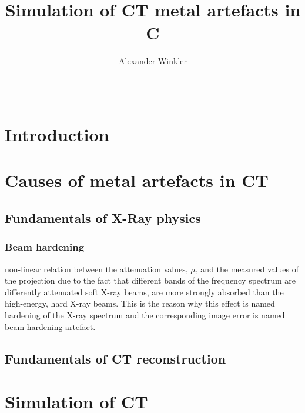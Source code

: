 \documentclass{acm_proc_article-sp}
\begin{document}
\setlength{\parindent}{10pt}
\setlength{\parskip}{35pt}



\title{Simulation of CT metal artefacts in C}
\author{
  \alignauthor Alexander Winkler\\
    \\
    \\
     }

\maketitle

\begin{abstract}
\end{abstract}


\section{Introduction}

\section{Causes of metal artefacts in CT}
\subsection{Fundamentals of X-Ray physics}
\subsubsection{Beam hardening}
non-linear relation between the attenuation values, \(\mu\), and the measured values of the projection
due to the fact that different bands of the frequency spectrum are differently attenuated
soft X-ray beams, are more strongly absorbed than the high-energy, hard X-ray beams. This is the reason why this effect is named hardening of the X-ray spectrum and the corresponding image error is named beam-hardening artefact.
\subsection{Fundamentals of CT reconstruction}

\section{Simulation of CT}
\end{document}
